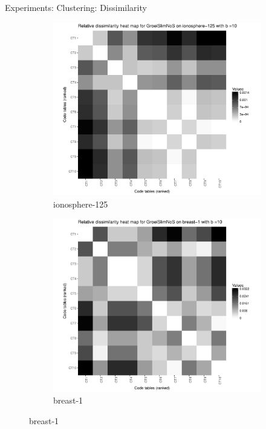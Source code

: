 \documentclass{beamer}
\begin{document}
\begin{frame}{Experiments: Clustering: Dissimilarity}
\begin{figure}
  \centering
  \begin{subfigure}[b]{0.45\textwidth}
    \includegraphics[width=\textwidth]{img/dissim-iono-125}
    \caption{ionosphere-125}
  \end{subfigure}
  \begin{subfigure}[b]{0.45\textwidth}
    \includegraphics[width=\textwidth]{img/dissim-breast-1}
    \caption{breast-1}
  \end{subfigure} 
\end{figure}
\end{frame}
\end{document}
